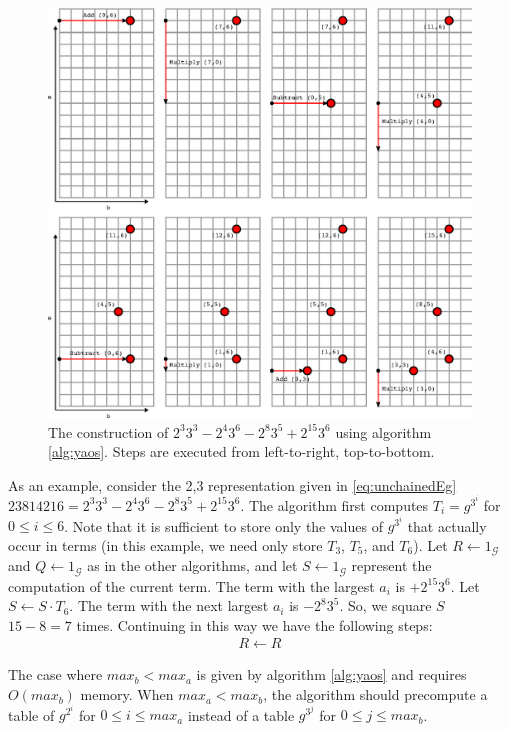 \documentclass{ucalgthes1}
\theoremstyle{plain}
\theoremstyle{definition}
\begin{document}
\begin{figure}[htb!]
\centering
\includegraphics{yao1}
\caption{The construction of $2^3 3^3 - 2^4 3^6 - 2^8 3^5 + 2^{15} 3^6$ using algorithm \ref{alg:yaos}.  Steps are executed from left-to-right, top-to-bottom.}
\label{fig:FigureExample}
\end{figure}

As an example, consider the 2,3 representation given in \eqref{eq:unchainedEg} $23814216 = 2^3 3^3 - 2^4 3^6 - 2^8 3^5 + 2^{15} 3^6$.  The algorithm first computes $T_i = g^{3^i}$ for $0 \le i \le 6$.  Note that it is sufficient to store only the values of $g^{3^i}$ that actually occur in terms (in this example, we need only store $T_3$, $T_5$, and $T_6$).  Let $R \gets 1_{\mathcal G}$ and $Q \gets 1_{\mathcal G}$ as in the other algorithms, and let $S \gets 1_{\mathcal G}$ represent the computation of the current term.  The term with the largest $a_i$ is $+2^{15}3^6$.  Let $S \gets S \cdot T_6$.  The term with the next largest $a_i$ is $-2^8 3^5$.   So, we square $S$ $15-8=7$ times.  Continuing in this way we have the following steps:
\begin{align*}
	R \gets R
\end{align*}

The case where $max_b < max_a$ is given by algorithm \ref{alg:yaos} and requires $O(max_b)$ memory.  When $max_a < max_b$, the algorithm should precompute a table of $g^{2^i}$ for $0 \le i \le max_a$ instead of a table $g^{3^j}$ for $0 \le j \le max_b$.
\end{document}
